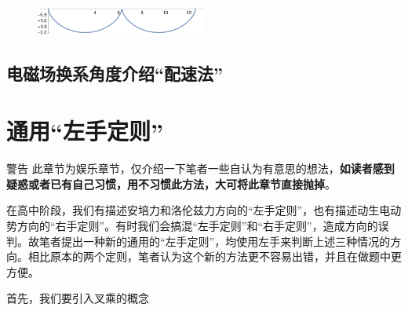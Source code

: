 \begin{figure}[htbp]
\centering
\includegraphics[width=0.5\textwidth]{pic_eled/psf_p3.pdf}
\end{figure}

\subsection{电磁场换系角度介绍“配速法”}


\section{通用“左手定则” \quad * }

\label{s_tyzsdz}

\begin{mk}{警告}{}
此章节为娱乐章节，仅介绍一下笔者一些自认为有意思的想法，\textbf{如读者感到疑惑或者已有自己习惯，用不习惯此方法，大可将此章节直接抛掉}。
\end{mk}

在高中阶段，我们有描述安培力和洛伦兹力方向的“左手定则”，也有描述动生电动势方向的“右手定则”。有时我们会搞混“左手定则”和“右手定则”，造成方向的误判。故笔者提出一种新的通用的“左手定则”，均使用左手来判断上述三种情况的方向。相比原本的两个定则，笔者认为这个新的方法更不容易出错，并且在做题中更方便。

首先，我们要引入叉乘的概念

